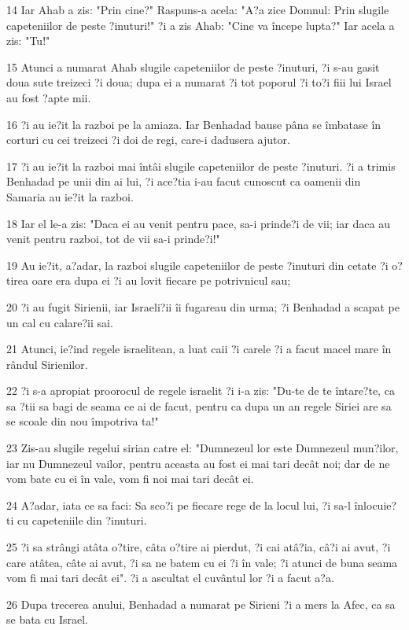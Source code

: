 \par 14 Iar Ahab a zis: "Prin cine?" Raspuns-a acela: "A?a zice Domnul: Prin slugile capeteniilor de peste ?inuturi!" ?i a zis Ahab: "Cine va începe lupta?" Iar acela a zis: "Tu!"
\par 15 Atunci a numarat Ahab slugile capeteniilor de peste ?inuturi, ?i s-au gasit doua sute treizeci ?i doua; dupa ei a numarat ?i tot poporul ?i to?i fiii lui Israel au fost ?apte mii.
\par 16 ?i au ie?it la razboi pe la amiaza. Iar Benhadad bause pâna se îmbatase în corturi cu cei treizeci ?i doi de regi, care-i dadusera ajutor.
\par 17 ?i au ie?it la razboi mai întâi slugile capeteniilor de peste ?inuturi. ?i a trimis Benhadad pe unii din ai lui, ?i ace?tia i-au facut cunoscut ca oamenii din Samaria au ie?it la razboi.
\par 18 Iar el le-a zis: "Daca ei au venit pentru pace, sa-i prinde?i de vii; iar daca au venit pentru razboi, tot de vii sa-i prinde?i!"
\par 19 Au ie?it, a?adar, la razboi slugile capeteniilor de peste ?inuturi din cetate ?i o?tirea oare era dupa ei ?i au lovit fiecare pe potrivnicul sau;
\par 20 ?i au fugit Sirienii, iar Israeli?ii îi fugareau din urma; ?i Benhadad a scapat pe un cal cu calare?ii sai.
\par 21 Atunci, ie?ind regele israelitean, a luat caii ?i carele ?i a facut macel mare în rândul Sirienilor.
\par 22 ?i s-a apropiat proorocul de regele israelit ?i i-a zis: "Du-te de te întare?te, ca sa ?tii sa bagi de seama ce ai de facut, pentru ca dupa un an regele Siriei are sa se scoale din nou împotriva ta!"
\par 23 Zis-au slugile regelui sirian catre el: "Dumnezeul lor este Dumnezeul mun?ilor, iar nu Dumnezeul vailor, pentru aceasta au fost ei mai tari decât noi; dar de ne vom bate cu ei în vale, vom fi noi mai tari decât ei.
\par 24 A?adar, iata ce sa faci: Sa sco?i pe fiecare rege de la locul lui, ?i sa-l înlocuie?ti cu capeteniile din ?inuturi.
\par 25 ?i sa strângi atâta o?tire, câta o?tire ai pierdut, ?i cai atâ?ia, câ?i ai avut, ?i care atâtea, câte ai avut, ?i sa ne batem cu ei ?i în vale; ?i atunci de buna seama vom fi mai tari decât ei". ?i a ascultat el cuvântul lor ?i a facut a?a.
\par 26 Dupa trecerea anului, Benhadad a numarat pe Sirieni ?i a mers la Afec, ca sa se bata cu Israel.
